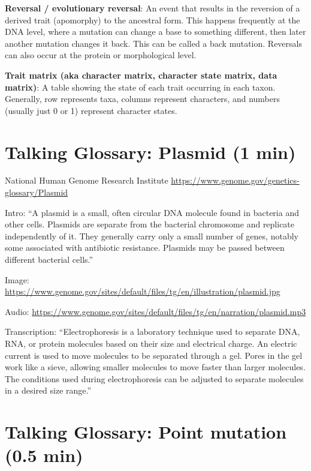 \documentclass[
]{book}
\begin{document}
\textbf{Reversal / evolutionary reversal}: An event that results in the reversion of a derived trait (apomorphy) to the ancestral form. This happens frequently at the DNA level, where a mutation can change a base to something different, then later another mutation changes it back. This can be called a back mutation. Reversals can also occur at the protein or morphological level.

\textbf{Trait matrix (aka character matrix, character state matrix, data matrix)}: A table showing the state of each trait occurring in each taxon. Generally, row represents taxa, columns represent characters, and numbers (usually just 0 or 1) represent character states.

\hypertarget{talking-glossary-plasmid-1-min}{%
\section{Talking Glossary: Plasmid (1 min)}\label{talking-glossary-plasmid-1-min}}

National Human Genome Research Institute
\url{https://www.genome.gov/genetics-glossary/Plasmid}

Intro: ``A plasmid is a small, often circular DNA molecule found in bacteria and other cells. Plasmids are separate from the bacterial chromosome and replicate independently of it. They generally carry only a small number of genes, notably some associated with antibiotic resistance. Plasmids may be passed between different bacterial cells.''

Image: \url{https://www.genome.gov/sites/default/files/tg/en/illustration/plasmid.jpg}

Audio: \url{https://www.genome.gov/sites/default/files/tg/en/narration/plasmid.mp3}

Transcription:
``Electrophoresis is a laboratory technique used to separate DNA, RNA, or protein molecules based on their size and electrical charge. An electric current is used to move molecules to be separated through a gel. Pores in the gel work like a sieve, allowing smaller molecules to move faster than larger molecules. The conditions used during electrophoresis can be adjusted to separate molecules in a desired size range.''

\hypertarget{talking-glossary-point-mutation-0.5-min}{%
\section{Talking Glossary: Point mutation (0.5 min)}\label{talking-glossary-point-mutation-0.5-min}}
\end{document}
